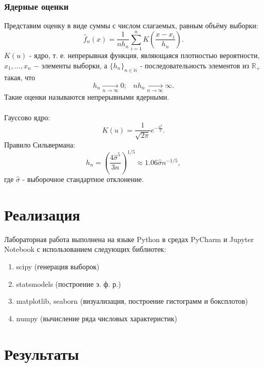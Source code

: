 \documentclass[a4paper]{article}
\begin{document}
\subsubsection{Ядерные оценки}
Представим оценку в виде суммы с числом слагаемых, равным объёму выборки:
\begin{equation}
    \widehat{f}_n(x)=\frac{1}{n h_n}\sum_{i=1}^n K\left(\frac{x-x_i}{h_n}\right).
\end{equation}
$K(u)$ - ядро, т. е. непрерывная функция, являющаяся плотностью вероятности, $x_1,...,x_n$ $-$ элементы выборки, а $\{h_n\}_{n\in\mathbb{N}}$ - последовательность элементов из $\mathbb{R}_+$ такая, что
\begin{equation}
    h_n\xrightarrow[n\to\infty]{}0;\;\;\;n h_n\xrightarrow[n\to\infty]{}\infty.
\end{equation}
Такие оценки называются непрерывными ядерными.\\\\
Гауссово ядро:
\begin{equation}
    K(u)=\frac{1}{\sqrt{2\pi}}e^{-\frac{u^2}{2}}.
\end{equation}
Правило Сильвермана:
\begin{equation}
    h_n=\left(\frac{4\hat{\sigma}^5}{3n}\right)^{1/5}\approx1.06\hat{\sigma}n^{-1/5},
\end{equation}
где $\hat{\sigma}$ - выборочное стандартное отклонение.
\section{Реализация}
Лабораторная работа выполнена на языке Python в средах PyCharm и Jupyter Notebook с использованием следующих библиотек:
\begin{enumerate}
    \item scipy (генерация выборок)
    \item statsmodels (построение э. ф. р.)
    \item matplotlib, seaborn (визуализация, построение гистограмм и боксплотов)
    \item numpy (вычисление ряда числовых характеристик)
\end{enumerate}
\section{Результаты}
\end{document}
